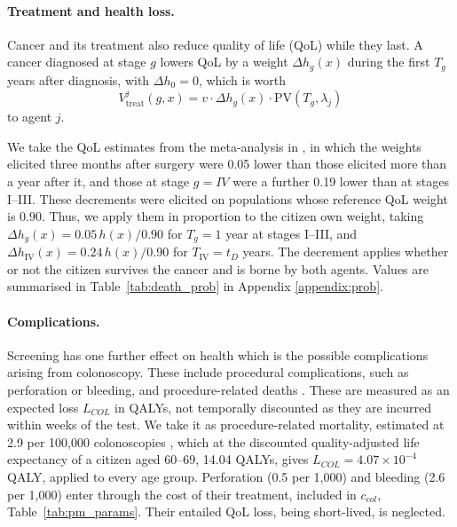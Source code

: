 \documentclass[12pt]{article}
\begin{document}
\paragraph{Treatment and health loss.} Cancer and its treatment also reduce quality of life (QoL) while they last. A cancer diagnosed at stage $g$ lowers QoL by a weight $\Delta h_g(x)$ during the first $T_g$ years after diagnosis, with $\Delta h_0 = 0$, which is worth
\begin{equation}\label{eq:vtreat}
V^{j}_{\text{treat}}(g, x) = v \cdot \Delta h_g(x) \cdot \mathrm{PV}(T_g,\lambda_j)
\end{equation}
to agent $j$. 

We take the QoL estimates from the meta-analysis in \citet{djalalov2014review}, in which the weights elicited three months after surgery were 0.05 lower than those elicited more than a year after it, and those at stage $g=IV$ were a further 0.19 lower than at stages I--III. These decrements were elicited on populations whose reference QoL weight is $0.90$. Thus, we apply them in proportion to the citizen own weight, taking $\Delta h_g(x) = 0.05\,h(x)/0.90$ for $T_g = 1$ year at stages I--III, and $\Delta h_{\text{IV}}(x) = 0.24\,h(x)/0.90$ for $T_{\text{IV}} = t_D$ years. The decrement applies whether or not the citizen survives the cancer and is borne by both agents. Values are summarised in Table~\ref{tab:death_prob} in Appendix \ref{appendix:prob}.

\paragraph{Complications.} Screening has one further effect on health which is the possible complications arising from colonoscopy. These include procedural complications, such as perforation or bleeding, and procedure-related deaths \citep{reumkens2016post, lin2021screening, barre2020cost}. These are measured as an expected loss $L_{COL}$ in QALYs, not temporally discounted as they are incurred within weeks of the test. We take it as procedure-related mortality, estimated at 2.9 per 100{,}000 colonoscopies \citep{reumkens2016post}, which at the discounted quality-adjusted life expectancy of a citizen aged 60--69, 14.04 QALYs, gives $L_{COL} = 4.07 \times 10^{-4}$ QALY, applied to every age group. Perforation (0.5 per 1{,}000) and bleeding (2.6 per 1{,}000) enter through the cost of their treatment, included in $c_{col}$, Table~\ref{tab:pm_params}. Their entailed QoL loss, being short-lived, is neglected.
\end{document}
